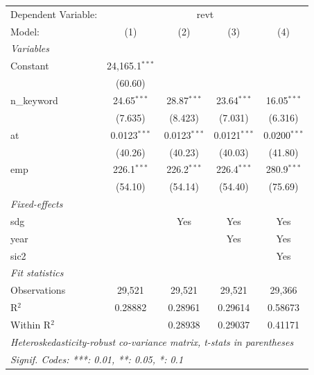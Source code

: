
\begingroup
\centering
\begin{tabular}{lcccc}
   \tabularnewline \midrule \midrule
   Dependent Variable: & \multicolumn{4}{c}{revt}\\
   Model:       & (1)              & (2)            & (3)            & (4)\\  
   \midrule
   \emph{Variables}\\
   Constant     & 24,165.1$^{***}$ &                &                &   \\   
                & (60.60)          &                &                &   \\   
   n\_keyword   & 24.65$^{***}$    & 28.87$^{***}$  & 23.64$^{***}$  & 16.05$^{***}$\\   
                & (7.635)          & (8.423)        & (7.031)        & (6.316)\\   
   at           & 0.0123$^{***}$   & 0.0123$^{***}$ & 0.0121$^{***}$ & 0.0200$^{***}$\\   
                & (40.26)          & (40.23)        & (40.03)        & (41.80)\\   
   emp          & 226.1$^{***}$    & 226.2$^{***}$  & 226.4$^{***}$  & 280.9$^{***}$\\   
                & (54.10)          & (54.14)        & (54.40)        & (75.69)\\   
   \midrule
   \emph{Fixed-effects}\\
   sdg          &                  & Yes            & Yes            & Yes\\  
   year         &                  &                & Yes            & Yes\\  
   sic2         &                  &                &                & Yes\\  
   \midrule
   \emph{Fit statistics}\\
   Observations & 29,521           & 29,521         & 29,521         & 29,366\\  
   R$^2$        & 0.28882          & 0.28961        & 0.29614        & 0.58673\\  
   Within R$^2$ &                  & 0.28938        & 0.29037        & 0.41171\\  
   \midrule \midrule
   \multicolumn{5}{l}{\emph{Heteroskedasticity-robust co-variance matrix, t-stats in parentheses}}\\
   \multicolumn{5}{l}{\emph{Signif. Codes: ***: 0.01, **: 0.05, *: 0.1}}\\
\end{tabular}
\par\endgroup


